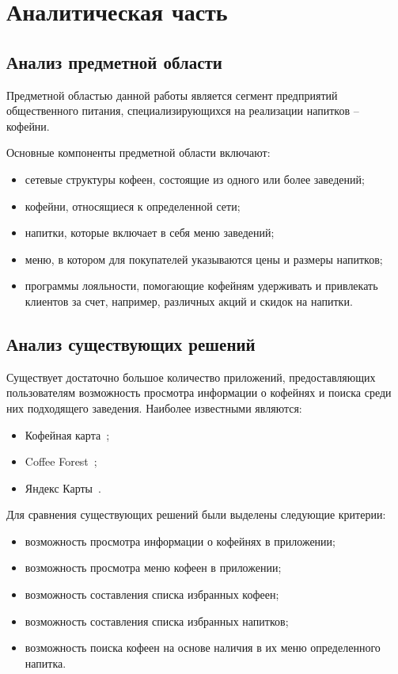 \chapter{Аналитическая часть}
\section{Анализ предметной области}
Предметной областью данной работы является сегмент предприятий общественного питания, специализирующихся на реализации напитков -- кофейни.

Основные компоненты предметной области включают:
\begin{itemize}
	\item сетевые структуры кофеен, состоящие из одного или более заведений;
	\item кофейни, относящиеся к определенной сети;
	\item напитки, которые включает в себя меню заведений;
	\item меню, в котором для покупателей указываются цены и размеры напитков;
	\item программы лояльности, помогающие кофейням удерживать и привлекать клиентов за счет, например, различных акций и скидок на напитки.
\end{itemize}

\section{Анализ существующих решений}
Существует достаточно большое количество приложений, предоставляющих пользователям возможность просмотра информации о кофейнях и поиска среди них подходящего заведения. Наиболее известными являются:
\begin{itemize}
\item Кофейная карта~\cite{coffee_kart};
\item Coffee Forest~\cite{coffee_forest};
\item Яндекс Карты~\cite{yandex}.
\end{itemize}

Для сравнения существующих решений были выделены следующие критерии:
\begin{itemize}
	\item возможность просмотра информации о кофейнях в приложении;
	\item возможность просмотра меню кофеен в приложении;
	\item возможность составления списка избранных кофеен;
	\item возможность составления списка избранных напитков;
	\item возможность поиска кофеен на основе наличия в их меню определенного напитка.
\end{itemize}

